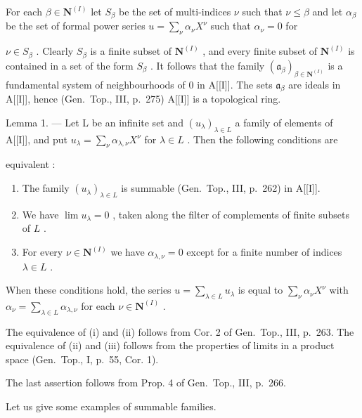 For each \(\beta \in \mathbf{N}^{(I)}\) let \(S_{\beta}\) be the set of multi-indices \(\nu\) such that \(\nu \leqslant \beta\) and let \(\alpha_{\beta}\) be the set of formal power series \(u = \sum_{\nu} \alpha_{\nu} X^{\nu}\) such that \(\alpha_{\nu} = 0\) for

\(\nu \in S_{\beta}\) . Clearly \(S_{\beta}\) is a finite subset of \(\mathbf{N}^{(I)}\) , and every finite subset of \(\mathbf{N}^{(I)}\) is contained in a set of the form \(S_{\beta}\) . It follows that the family \((\mathfrak{a}_{\beta})_{\beta \in \mathbf{N}^{(I)}}\) is a fundamental system of neighbourhoods of 0 in A{[}{[}I{]}{]}. The sets \(\mathfrak{a}_{\beta}\) are ideals in A{[}{[}I{]}{]}, hence (Gen.~Top., III, p.~275) A{[}{[}I{]}{]} is a topological ring.

Lemma 1. --- Let L be an infinite set and \((u_{\lambda})_{\lambda \in L}\) a family of elements of A{[}{[}I{]}{]}, and put \(u_{\lambda} = \sum_{\nu} \alpha_{\lambda, \nu} X^{\nu}\) for \(\lambda \in L\) . Then the following conditions are

equivalent :

\begin{enumerate}
\def\labelenumi{(\roman{enumi})}
\item
  The family \((u_{\lambda})_{\lambda \in L}\) is summable (Gen.~Top., III, p.~262) in A{[}{[}I{]}{]}.
\item
  We have \(\lim u_{\lambda} = 0\) , taken along the filter of complements of finite subsets of \(L\) .
\item
  For every \(\nu \in \mathbf{N}^{(I)}\) we have \(\alpha_{\lambda, \nu} = 0\) except for a finite number of indices \(\lambda \in L\) .
\end{enumerate}

When these conditions hold, the series \(u = \sum_{\lambda \in L} u_{\lambda}\) is equal to \(\sum_{\nu} \alpha_{\nu} X^{\nu}\) with \(\alpha_{\nu} = \sum_{\lambda \in L} \alpha_{\lambda, \nu}\) for each \(\nu \in \mathbf{N}^{(I)}\) .

The equivalence of (i) and (ii) follows from Cor. 2 of Gen.~Top., III, p.~263. The equivalence of (ii) and (iii) follows from the properties of limits in a product space (Gen.~Top., I, p.~55, Cor. 1).

The last assertion follows from Prop. 4 of Gen.~Top., III, p.~266.

Let us give some examples of summable families.

